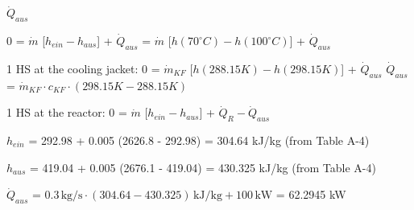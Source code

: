 \( \dot{Q}_{aus} \)  

0 = \( \dot{m} \) [\( h_{ein} - h_{aus} \)] + \( \dot{Q}_{aus} \)  
= \( \dot{m} \) [\( h(70^\circ C) - h(100^\circ C) \)] + \( \dot{Q}_{aus} \)  

1 HS at the cooling jacket:  
0 = \( \dot{m}_{KF} \) [\( h(288.15K) - h(298.15K) \)] + \( \dot{Q}_{aus} \)  
\( \dot{Q}_{aus} \) = \( \dot{m}_{KF} \cdot c_{KF} \cdot (298.15K - 288.15K) \)  

1 HS at the reactor:  
0 = \( \dot{m} \) [\( h_{ein} - h_{aus} \)] + \( \dot{Q}_R - \dot{Q}_{aus} \)  

\( h_{ein} \) = 292.98 + 0.005 (2626.8 - 292.98)  
= 304.64 kJ/kg (from Table A-4)  

\( h_{aus} \) = 419.04 + 0.005 (2676.1 - 419.04)  
= 430.325 kJ/kg (from Table A-4)  

\( \dot{Q}_{aus} \) = \( 0.3 \, \text{kg/s} \cdot (304.64 - 430.325) \, \text{kJ/kg} + 100 \, \text{kW} \)  
= 62.2945 kW